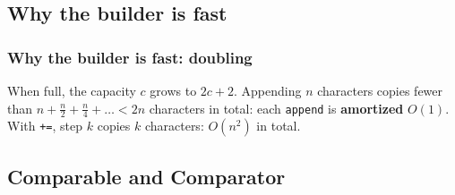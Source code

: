 \documentclass[aspectratio=169,10pt,compress]{beamer}
\begin{document}
\subsection[Amortized]{Why the builder is fast}




\begin{frame}[t,fragile] \frametitle{Why the builder is fast: doubling}

  \vspace{0.3em}
  \small When full, the capacity $c$ grows to $2c + 2$. Appending $n$ characters copies fewer than
  $n + \frac{n}{2} + \frac{n}{4} + \dots < 2n$ characters in total: each \texttt{append} is \textbf{amortized} $O(1)$.
  With \texttt{+=}, step $k$ copies $k$ characters: $O(n^{2})$ in total.
\end{frame}


\subsection[Comparators]{Comparable and Comparator}
\end{document}

